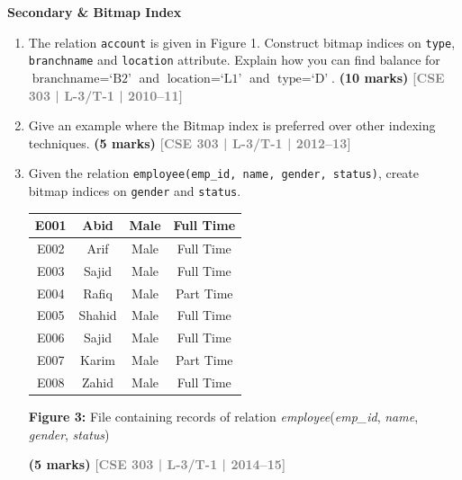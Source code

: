 \documentclass[12pt,a3paper]{article}
\newcommand{\yr}[1]{\hfill\textcolor{gray}{\small\textbf{[#1]}}}
\newcommand{\mk}[1]{\textcolor{orange!70!black}{\small\textbf{(#1 marks)}}}
\newcommand{\subtopic}[2]{%
  \vspace{10pt}
  \noindent\begin{tcolorbox}[colback=#1!8,colframe=#1,boxrule=0.6pt,arc=4pt,
    left=6pt,right=6pt,top=4pt,bottom=4pt]
    \small\bfseries\textcolor{#1}{#2}
  \end{tcolorbox}
  \vspace{2pt}
}
\begin{document}
\subtopic{cD}{Secondary \& Bitmap Index}
\label{sub:s5-secondary}

\begin{enumerate}

\item The relation \texttt{account} is given in Figure 1. Construct bitmap indices on \texttt{type}, \texttt{branchname} and \texttt{location} attribute. Explain how you can find balance for $\text{branchname} = \text{`B2'}$ and $\text{location} = \text{`L1'}$ and $\text{type} = \text{`D'}$.
\mk{10} \yr{CSE 303 | L-3/T-1 | 2010--11}

\item Give an example where the Bitmap index is preferred over other indexing techniques.
\mk{5} \yr{CSE 303 | L-3/T-1 | 2012--13}

\item Given the relation \texttt{employee(emp\_id, name, gender, status)}, create bitmap indices on \texttt{gender} and \texttt{status}.

\begin{center}
  \renewcommand{\arraystretch}{1.3} %
    \begin{tabular}{|c|c|c|c|}
        \hline
        E001 & Abid   & Male & Full Time \\ \hline
        E002 & Arif   & Male & Full Time \\ \hline
        E003 & Sajid  & Male & Full Time \\ \hline
        E004 & Rafiq  & Male & Part Time \\ \hline
        E005 & Shahid & Male & Full Time \\ \hline
        E006 & Sajid  & Male & Full Time \\ \hline
        E007 & Karim  & Male & Part Time \\ \hline
        E008 & Zahid  & Male & Full Time \\ \hline
    \end{tabular}
    
    \vspace{0.4cm}
    \textbf{Figure 3:} File containing records of relation \textit{employee}(\textit{emp\_id}, \textit{name}, \textit{gender}, \textit{status})
\end{center}

\mk{5} \yr{CSE 303 | L-3/T-1 | 2014--15}


\end{enumerate}
\end{document}
